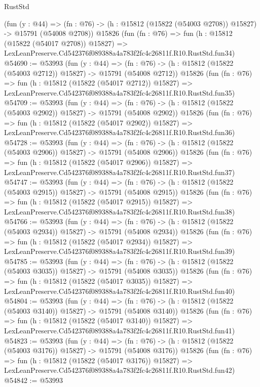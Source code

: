\begin{lexlean}{RustStd}
\begin{coremodule}
    (fun (y : @44) =>
    (fn : @76) -> (h : @15812 (@15822 (@54003 @2708)) @15827) -> @15791 (@54008 @2708))
    @15826
    (fun (fn : @76) =>
    fun (h : @15812 (@15822 (@54017 @2708)) @15827) =>
    LexLeanPreserve.Cd542376f089388a4a783f2fc4c26811f.R10.RustStd.fun34)
@54690 := @53993
    (fun (y : @44) =>
    (fn : @76) -> (h : @15812 (@15822 (@54003 @2712)) @15827) -> @15791 (@54008 @2712))
    @15826
    (fun (fn : @76) =>
    fun (h : @15812 (@15822 (@54017 @2712)) @15827) =>
    LexLeanPreserve.Cd542376f089388a4a783f2fc4c26811f.R10.RustStd.fun35)
@54709 := @53993
    (fun (y : @44) =>
    (fn : @76) -> (h : @15812 (@15822 (@54003 @2902)) @15827) -> @15791 (@54008 @2902))
    @15826
    (fun (fn : @76) =>
    fun (h : @15812 (@15822 (@54017 @2902)) @15827) =>
    LexLeanPreserve.Cd542376f089388a4a783f2fc4c26811f.R10.RustStd.fun36)
@54728 := @53993
    (fun (y : @44) =>
    (fn : @76) -> (h : @15812 (@15822 (@54003 @2906)) @15827) -> @15791 (@54008 @2906))
    @15826
    (fun (fn : @76) =>
    fun (h : @15812 (@15822 (@54017 @2906)) @15827) =>
    LexLeanPreserve.Cd542376f089388a4a783f2fc4c26811f.R10.RustStd.fun37)
@54747 := @53993
    (fun (y : @44) =>
    (fn : @76) -> (h : @15812 (@15822 (@54003 @2915)) @15827) -> @15791 (@54008 @2915))
    @15826
    (fun (fn : @76) =>
    fun (h : @15812 (@15822 (@54017 @2915)) @15827) =>
    LexLeanPreserve.Cd542376f089388a4a783f2fc4c26811f.R10.RustStd.fun38)
@54766 := @53993
    (fun (y : @44) =>
    (fn : @76) -> (h : @15812 (@15822 (@54003 @2934)) @15827) -> @15791 (@54008 @2934))
    @15826
    (fun (fn : @76) =>
    fun (h : @15812 (@15822 (@54017 @2934)) @15827) =>
    LexLeanPreserve.Cd542376f089388a4a783f2fc4c26811f.R10.RustStd.fun39)
@54785 := @53993
    (fun (y : @44) =>
    (fn : @76) -> (h : @15812 (@15822 (@54003 @3035)) @15827) -> @15791 (@54008 @3035))
    @15826
    (fun (fn : @76) =>
    fun (h : @15812 (@15822 (@54017 @3035)) @15827) =>
    LexLeanPreserve.Cd542376f089388a4a783f2fc4c26811f.R10.RustStd.fun40)
@54804 := @53993
    (fun (y : @44) =>
    (fn : @76) -> (h : @15812 (@15822 (@54003 @3140)) @15827) -> @15791 (@54008 @3140))
    @15826
    (fun (fn : @76) =>
    fun (h : @15812 (@15822 (@54017 @3140)) @15827) =>
    LexLeanPreserve.Cd542376f089388a4a783f2fc4c26811f.R10.RustStd.fun41)
@54823 := @53993
    (fun (y : @44) =>
    (fn : @76) -> (h : @15812 (@15822 (@54003 @3176)) @15827) -> @15791 (@54008 @3176))
    @15826
    (fun (fn : @76) =>
    fun (h : @15812 (@15822 (@54017 @3176)) @15827) =>
    LexLeanPreserve.Cd542376f089388a4a783f2fc4c26811f.R10.RustStd.fun42)
@54842 := @53993

\end{coremodule}
\end{lexlean}
